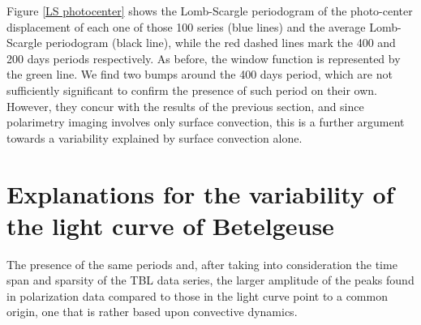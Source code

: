 \documentclass{aa}
\begin{document}
Figure \ref{LS photocenter} shows the Lomb-Scargle periodogram of the photo-center displacement of each one of those 100 series (blue lines) and the average Lomb-Scargle periodogram (black line), 
while the red dashed lines mark the 400 and 
200 days periods respectively. As before, the window function is represented by the green line. We find two bumps around the 400 days period, which are not 
sufficiently significant to confirm the presence of such period on their own. However, they concur with the results of the previous section, 
and since polarimetry imaging involves only surface convection, this is a further argument towards a variability explained by surface convection alone. 

\section{Explanations for the variability of the light curve of Betelgeuse}
\label{section 3}
The presence of the same 
periods and, after taking into consideration the time span and sparsity of the TBL data series, the larger amplitude of the peaks found in
polarization data  compared to those  in the light curve point to a common origin, one that is rather based upon convective dynamics. 
\end{document}
